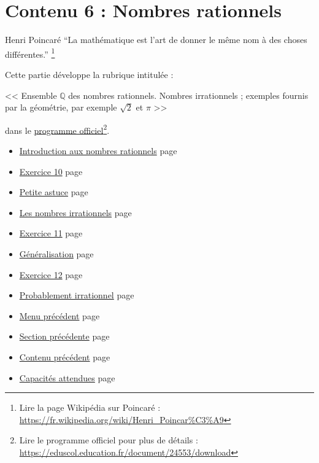 \documentclass[a4paper,11pt]{book}
\begin{document}
\clearpage


\chapter{Contenu 6 : Nombres rationnels}
\label{sec:org0412fad}
\label{orgee452f1}
\label{page:sec2.6content6}

\begin{myquote}{Henri Poincaré}
\enquote{La mathématique est l'art de donner le même nom à des choses
différentes.}
\footnote{Lire la page Wikipédia sur Poincaré : \url{https://fr.wikipedia.org/wiki/Henri_Poincar\%C3\%A9}}
\end{myquote}

\clearpage

Cette partie développe la rubrique intitulée :

<< Ensemble \(\mathbb{Q}\) des nombres
rationnels. Nombres
irrationnels ; exemples fournis par la
géométrie, par exemple \(\sqrt{2}\) et \(\pi\) >>

dans le \href{https://eduscol.education.fr/document/24553/download}{programme officiel}\footnote{Lire le programme officiel pour plus de détails :
\url{https://eduscol.education.fr/document/24553/download}}.

\clearpage

\label{orgc112f4f}
\label{page:content6-menu}
\begin{itemize}
\item \hyperref[org9b34a43]{Introduction aux nombres rationnels} page \pageref{page:sec2.6.1intro-ratio}
\item \hyperref[org76d4ecb]{Exercice 10} page \pageref{page:sec2.6.2exo10}
\item \hyperref[org36b98de]{Petite astuce} page \pageref{page:sec2.6.3tip}
\item \hyperref[orgb8d930f]{Les nombres irrationnels} page \pageref{page:sec2.6.4irr}
\item \hyperref[org1486a04]{Exercice 11} page \pageref{page:sec2.6.5exo11}
\item \hyperref[org24a50ec]{Généralisation} page \pageref{page:sec2.6.6gen}
\item \hyperref[org677ae69]{Exercice 12} page \pageref{page:sec2.6.7exo12}
\item \hyperref[org01d7b7d]{Probablement irrationnel} page \pageref{page:sec2.6.8prob}
\item \hyperref[org2ce8f1f]{Menu précédent} page \pageref{page:content-menu}
\item \hyperref[org2d0b4af]{Section précédente} page \pageref{page:sec2.5.3souv}
\item \hyperref[org86f143d]{Contenu précédent} page \pageref{page:sec2.5content5}
\item \hyperref[org9c65356]{Capacités attendues} page \pageref{page:sec3capacities}
\end{itemize}
\end{document}
